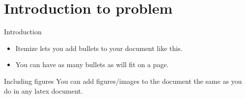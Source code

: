 \section{Introduction to problem}
\frame{\sectionpage} %
    
\begin{frame}{Introduction}
\begin{itemize}
    \item Itemize lets you add bullets to your document like this.
    \item You can have as many bullets as will fit on a page.
\end{itemize}
\end{frame}

\begin{frame}{Including figures}
You can add figures/images to the document the same as you do in any latex document.  


\end{frame}
